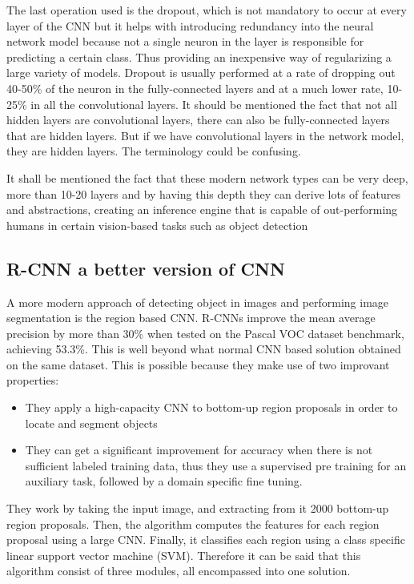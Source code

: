 \documentclass[12pt,a4paper,twoside]{report}
\begin{document}
The last operation used is the dropout, which is not mandatory to occur at every layer of the CNN but it helps with introducing redundancy into the neural network model because not a single neuron in the layer is responsible for predicting a certain class. Thus providing an inexpensive way of regularizing a large variety of models. Dropout is usually performed at a rate of dropping out 40-50\% of the neuron in the fully-connected layers and at a much lower rate, 10-25\% in all the convolutional layers. It should be mentioned the fact that not all hidden layers are convolutional layers, there can also be fully-connected layers that are hidden layers. But if we have convolutional layers in the network model, they are hidden layers. The terminology could be confusing.\par

It shall be mentioned the fact that these modern network types can be very deep, more than 10-20 layers and by having this depth they can derive lots of features and abstractions, creating an inference engine that is capable of out-performing humans in certain vision-based tasks such as object detection

\subsection{R-CNN a better version of CNN}
A more modern approach of detecting object in images and performing image segmentation is the region based CNN\cite{article-rcnn}.
R-CNNs improve the mean average precision by more than 30\% when tested on the Pascal VOC dataset benchmark, achieving 53.3\%. This is well beyond what normal CNN based solution obtained on the same dataset. This is possible because they make use of two improvant properties:
\begin{itemize}
    \item They apply a high-capacity CNN to bottom-up region proposals in order to locate and segment objects
    \item They can get a significant improvement for accuracy when there is not sufficient labeled training data, thus they use a supervised pre training for an auxiliary task, followed by a domain specific fine tuning.
\end{itemize}

They work by taking the input image, and extracting from it 2000 bottom-up region proposals. Then, the algorithm computes the features for each region proposal using a large CNN. Finally, it classifies each region using a class specific linear support vector machine (SVM). Therefore it can be said that this algorithm consist of three modules, all encompassed into one solution.
\end{document}
